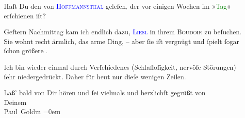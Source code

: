 \pstart
           {\pb}Haſt Du den \label{K_L03229-7v}\label{K_L03229-7h} von \textsc{\textcolor{blue}{Hoffmannsthal}{}\ledrightnote{\textcolor{blue}{Hugo von Hofmannsthal}}} geleſen, der vor einigen Wochen im »\textcolor{green}{Tag}{}\ledrightnote{\textcolor{green}{Der Tag}}«
               erſchienen iſt?\pend
           
\pstart
           Geſtern{ }Nachmittag kam ich endlich dazu, \textsc{\textcolor{blue}{Liesl}{}\ledrightnote{\textcolor{blue}{Elisabeth Steinrück}}} in ihrem \textsc{Boudoir} zu beſuchen. Sie wohnt recht
               ärmlich, das arme Ding, – aber ſie iſt vergnügt und ſpielt ſogar ſchon größere
                  \label{K_L03229-11v}\label{K_L03229-11h}.\pend
           
\pstart
           Ich bin wieder einmal durch Verſchiedenes (Schlafloſigkeit, nervöſe Störungen) ſehr
                  {\pb}niedergedrückt. Daher für heut nur dieſe wenigen Zeilen.\pend
           
\pstart
           Laß’ bald von Dir hören und ſei vielmals und herzlichſt gegrüßt von {\\[\baselineskip]}Deinem {\\[\baselineskip]}\spacefill\mbox{Paul Goldm}\pend
           \leftskip=0em{}\endnumbering{}
\begin{anhang}
\end{anhang}
      
